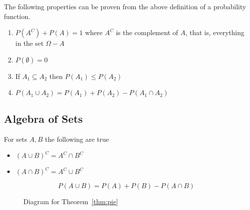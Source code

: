 \documentclass[../main.tex]{subfiles}
\begin{document}
\begin{theorem} The following properties can be proven from the above definition of a probability function. 
\begin{enumerate}
	\item $P(A^C) + P(A) = 1$ where $A^C$ is the complement of $A$, that is, everything in the set $\Omega - A$
	\item $P(\emptyset) = 0$
	\item If $A_1 \subseteq A_2$ then $P(A_1) \leq P(A_2)$
	\item $P(A_1 \cup A_2) = P(A_1) + P(A_2) - P(A_1 \cap A_2)$
\end{enumerate}
\end{theorem}

\subsection{Algebra of Sets}

\begin{theorem}
	For sets $A,B$ the following are true
	\begin{itemize}
		\item $(A \cup B)^C = A^C \cap B^C$
		\item $(A \cap B)^C = A^C \cup B^C$
	\end{itemize}
\end{theorem}

\begin{theorem}
	$$P(A \cup B) = P(A) + P(B) - P(A \cap B)$$
	\label{thm:pie}
\end{theorem}

	\begin{figure}
	\begin{center}
		\def\firstcircle{(0,0) circle (1.5cm)}
		\def\secondcircle{(0cm:2cm) circle (1.5cm)}
	\end{center}
	\caption{Diagram for Theorem~\ref{thm:pie}}
	\label{fig:pie}
\end{figure}
\end{document}

